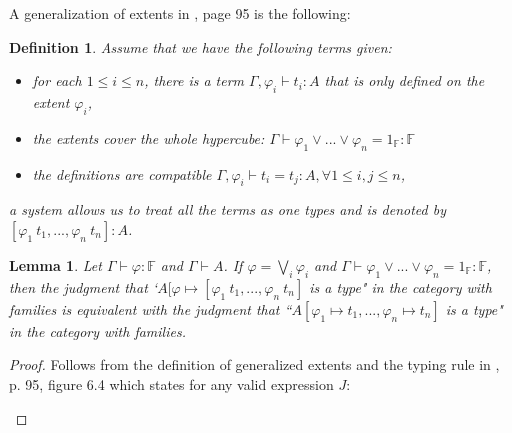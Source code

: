 \documentclass[12pt,a4paper,twoside,xetex,draft]{book}
\newcommand{\keyword}[1]{\emph{#1}\index{#1}}
\newtheorem{lemma}[theorem]{Lemma}
\newtheorem{definition}[theorem]{Definition}
\begin{document}
A generalization of extents in \cite{Huber2016}, page 95 is the following:

\begin{prooftree}
\end{prooftree}

\begin{definition}Assume that we have the following terms given: 

\begin{itemize}
\item for each $1 \leq i \leq n$, there is a term  $\Gamma, \varphi_i \vdash t_i : A$ that is only defined on the extent $\varphi_i$, 
\item the extents cover the whole hypercube: $\Gamma \vdash \varphi_1 \vee ... \vee \varphi_n = 1_{\mathbb{F}} : \mathbb{F}$ 
\item the definitions are compatible $\Gamma, \varphi_i \vdash t_i = t_j : A, \forall 1\leq i,j\leq n$, 
\end{itemize}
a \keyword{system} allows us to treat all the terms as one types and is denoted by $[\varphi_1 \  t_1, ..., \varphi_n \ t_n]: A$.
\end{definition}

\begin{lemma}\label{extentrewrite}
Let $\Gamma \vdash \varphi : \mathbb{F}$ and $\Gamma \vdash A$. If $\varphi = \bigvee_i \varphi_i$ and $\Gamma \vdash \varphi_1 \vee ... \vee \varphi_n = 1_{\mathbb{F}} : \mathbb{F}$, then the judgment that `$A [\varphi \mapsto  [\varphi_1 \ t_1, ..., \varphi_n \ t_n]$ is a type" in the category with families is equivalent with the judgment that ``$A [\varphi_1 \mapsto t_1, ..., \varphi_n \mapsto t_n]$ is a type" in the category with families.

\end{lemma}

\begin{proof}
Follows from the definition of generalized extents and the typing rule in \cite{Huber2016}, p. 95, figure 6.4 which states for any valid expression $J$: 

\begin{prooftree}
\end{prooftree}

\end{proof}
\end{document}
